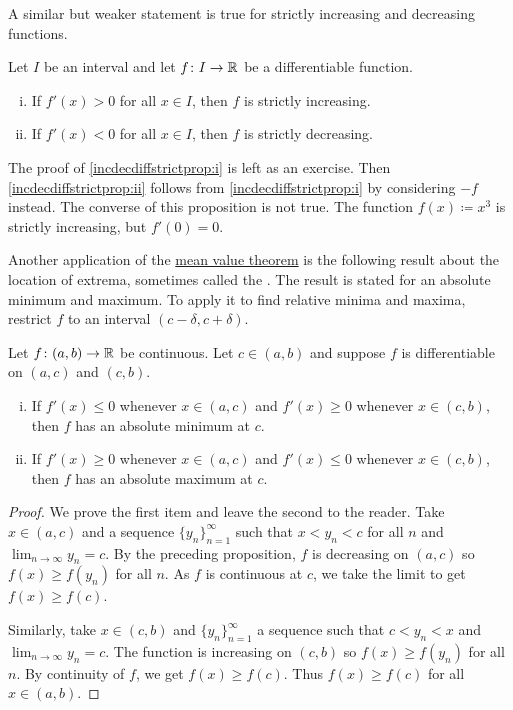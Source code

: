 A similar but weaker statement is true for strictly increasing and
decreasing functions.

\begin{prop} \label{incdecdiffstrictprop}
Let $I$ be an interval and
let $f \colon I \to {\mathbb{R}}$ be a differentiable function.
\begin{enumerate}[(i)]
\item
\label{incdecdiffstrictprop:i}
If $f'(x) > 0$ for all $x \in I$, then
$f$ is strictly increasing.
\item
\label{incdecdiffstrictprop:ii}
If $f'(x) < 0$ for all $x \in I$,
then $f$ is strictly decreasing.
\end{enumerate}
\end{prop}

The proof of
\ref{incdecdiffstrictprop:i}
is left as an exercise.
Then \ref{incdecdiffstrictprop:ii}
follows from 
\ref{incdecdiffstrictprop:i} by considering $-f$
instead.
The converse of this proposition is not true.  The function
$f(x) \coloneqq x^3$ is strictly increasing, but $f'(0) = 0$.

\medskip

Another application of the \hyperref[thm:mvt]{mean value theorem} is the following result about
the location of extrema, sometimes called the
\emph{}.
The result is stated for an absolute minimum and maximum.
To apply it to find relative minima
and maxima, restrict $f$ to an interval $(c-\delta,c+\delta)$.

\begin{prop} \label{firstderminmaxtest}
Let $f \colon (a,b) \to {\mathbb{R}}$ be continuous.  Let $c \in (a,b)$
and suppose
$f$ is differentiable on $(a,c)$ and $(c,b)$.
\begin{enumerate}[(i)]
\item If $f'(x) \leq 0$ whenever $x \in (a,c)$ and
 $f'(x) \geq 0$ whenever $x \in (c,b)$, then $f$ has an absolute minimum 
at $c$.
\item If $f'(x) \geq 0$ whenever $x \in (a,c)$ and
 $f'(x) \leq 0$ whenever $x \in (c,b)$, then $f$ has an absolute maximum
at $c$.
\end{enumerate}
\end{prop}

\begin{proof}
We prove the first item and leave the second to the reader.
Take $x \in (a,c)$
and a sequence $\{ y_n\}_{n=1}^\infty$ such that $x < y_n < c$ for all $n$
and $\lim_{n\to\infty} y_n = c$.
By the preceding proposition,
$f$ is decreasing on $(a,c)$ so $f(x) \geq f(y_n)$ for all $n$.
As $f$ is
continuous at $c$, we take the limit to get
$f(x) \geq f(c)$.

Similarly, take $x \in (c,b)$
and $\{ y_n\}_{n=1}^\infty$ a sequence such that $c < y_n < x$ and
$\lim_{n\to\infty} y_n = c$.
The function is increasing on $(c,b)$ so $f(x) \geq f(y_n)$ for all $n$.
By continuity of $f$, we get
$f(x) \geq f(c)$.  Thus $f(x) \geq f(c)$ for all
$x \in (a,b)$.
\end{proof}

